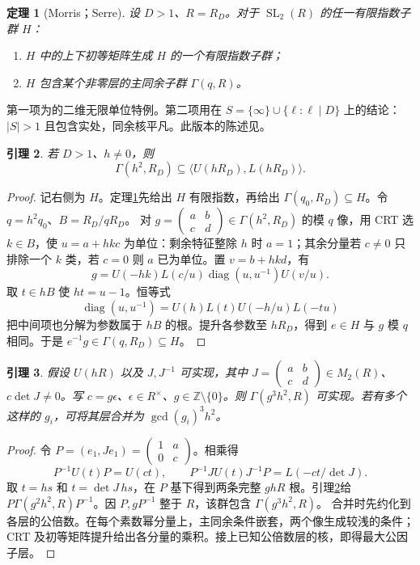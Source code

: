 \documentclass[11pt,a4paper]{article}
\newcommand{\Z}{\mathbb Z}
\newcommand{\SL}{\operatorname{SL}}
\newcommand{\diag}{\operatorname{diag}}
\newtheorem{theorem}{定理}[section]
\newtheorem{lemma}[theorem]{引理}
\theoremstyle{definition}
\numberwithin{equation}{section}
\begin{document}
\begin{theorem}[Morris；Serre]\label{thm:arithmetic-external}
设 $D>1$、$R=R_D$。对于 $\SL_2(R)$ 的任一有限指数子群 $H$：
\begin{enumerate}
\item $H$ 中的上下初等矩阵生成 $H$ 的一个有限指数子群；
\item $H$ 包含某个非零层的主同余子群 $\Gamma(q,R)$。
\end{enumerate}
\end{theorem}
第一项为\cite[Theorem 6.1(2)]{morris}的二维无限单位特例。第二项用\cite{serre}在 $S=\{\infty\}\cup\{\ell:\ell\mid D\}$ 上的结论：$|S|>1$ 且包含实处，同余核平凡。此版本的陈述见\cite[pp.308--309, Proposition 1 and Section 2.3]{prasad}。

\begin{lemma}\label{lem:deep}
若 $D>1$、$h\ne0$，则
\[
\Gamma(h^2,R_D)\subseteq\langle U(hR_D),L(hR_D)\rangle.
\]
\end{lemma}
\begin{proof}
记右侧为 $H$。定理\ref{thm:arithmetic-external}先给出 $H$ 有限指数，再给出 $\Gamma(q_0,R_D)\subseteq H$。令 $q=h^2q_0$、$B=R_D/qR_D$。
对 $g=\left(\begin{smallmatrix}a&b\\c&d\end{smallmatrix}\right)\in\Gamma(h^2,R_D)$ 的模 $q$ 像，用 CRT 选 $k\in B$，使 $u=a+hkc$ 为单位：剩余特征整除 $h$ 时 $a=1$；其余分量若 $c\ne0$ 只排除一个 $k$ 类，若 $c=0$ 则 $a$ 已为单位。置 $v=b+hkd$，有
\[
g=U(-hk)L(c/u)\diag(u,u^{-1})U(v/u).
\]
取 $t\in hB$ 使 $ht=u-1$。恒等式
\[
\diag(u,u^{-1})=U(h)L(t)U(-h/u)L(-tu)
\]
把中间项也分解为参数属于 $hB$ 的根。提升各参数至 $hR_D$，得到 $e\in H$ 与 $g$ 模 $q$ 相同。于是 $e^{-1}g\in\Gamma(q,R_D)\subseteq H$。
\end{proof}

\begin{lemma}\label{lem:transverse}
假设 $U(hR)$ 以及 $J,J^{-1}$ 可实现，其中 $J=\left(\begin{smallmatrix}a&b\\c&d\end{smallmatrix}\right)\in M_2(R)$、$c\det J\ne0$。写 $c=g\epsilon$、$\epsilon\in R^\times$、$g\in\Z\setminus\{0\}$。则 $\Gamma(g^3h^2,R)$ 可实现。若有多个这样的 $g_i$，可将其层合并为 $\gcd(g_i)^3h^2$。
\end{lemma}
\begin{proof}
令 $P=(e_1,Je_1)=\left(\begin{smallmatrix}1&a\\0&c\end{smallmatrix}\right)$。相乘得
\[
P^{-1}U(t)P=U(ct),\qquad
P^{-1}JU(t)J^{-1}P=L(-ct/\det J).
\]
取 $t=hs$ 和 $t=\det J\,hs$，在 $P$ 基下得到两条完整 $ghR$ 根。引理\ref{lem:deep}给 $P\Gamma(g^2h^2,R)P^{-1}$。因 $P,gP^{-1}$ 整于 $R$，该群包含 $\Gamma(g^3h^2,R)$。
合并时先约化到各层的公倍数。在每个素数幂分量上，主同余条件嵌套，两个像生成较浅的条件；CRT 及初等矩阵提升给出各分量的乘积。接上已知公倍数层的核，即得最大公因子层。
\end{proof}
\end{document}
